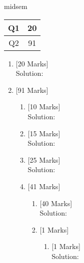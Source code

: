 \documentclass[10pt]{article}
\begin{document}
\vspace*{2cm}
\begin{center}
midsem
\\\vspace*{1cm}
\begin{tabular}{|c|c|}
\hline Q1 & 20 \\ \hline Q2 & 91 \\ \hline \end{tabular}\end{center}
\begin{enumerate}\item {}\hfill
[20 Marks]
\\ Solution:\vspace*{400pt}\item {}\hfill
[91 Marks]
\begin{enumerate}\item {}\hfill
[10 Marks]
\\ Solution:\vspace*{200pt}\item {}\hfill
[15 Marks]
\\ Solution:\vspace*{300pt}\item {}\hfill
[25 Marks]
\\ Solution:\vspace*{500pt}\item {}\hfill
[41 Marks]
\begin{enumerate}\item {}\hfill
[40 Marks]
\\ Solution:\vspace*{800pt}\item {}\hfill
[1 Marks]
\begin{enumerate}\item {}\hfill
[1 Marks]
\\ Solution:\vspace*{20pt}\end{enumerate}
\end{enumerate}
\end{enumerate}
\end{enumerate}
\end{document}
